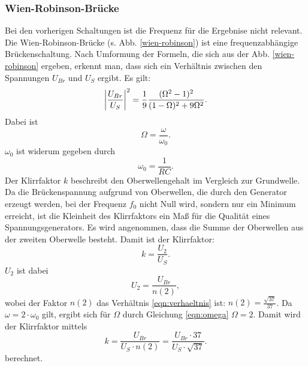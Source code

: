 \subsubsection{Wien-Robinson-Brücke}
Bei den vorherigen Schaltungen ist die Frequenz für die Ergebnise nicht relevant. %
\newline
Die Wien-Robinson-Brücke (s. Abb. \ref{wien-robinson}) ist eine frequenzabhängige Brückenschaltung.
Nach Umformung der Formeln, die sich aus der Abb. \ref{wien-robinson} ergeben, erkennt man, dass
sich ein Verhältnis zwischen den Spannungen $U_{Br}$ und $U_S$ ergibt. 
Es gilt:
\begin{equation}
\abs{\frac{U_{Br}}{U_S}}^2 = \frac{1}{9} \frac{(\Omega^2 -1)^2}{(1- \Omega)^2 + 9 \Omega^2}.
    \label{eqn:verhaeltnis}
\end{equation}
Dabei ist
\begin{equation}
    \Omega = \frac{\omega}{\omega_0}.
    \label{eqn:omega}
\end{equation}
$\omega_0$ ist widerum gegeben durch
\begin{equation}
    \omega_0 = \frac{1}{RC}.
    \label{omega0}
\end{equation}
\newline
Der Klirrfaktor $k$ beschreibt den Oberwellengehalt im Vergleich zur
Grundwelle. Da die Brückenspannung aufgrund von Oberwellen, die durch
den Generator erzeugt werden, bei der Frequenz $f_0$ nicht Null wird,
sondern nur ein Minimum erreicht, ist die Kleinheit des Klirrfaktors
ein Maß für die Qualität eines Spannungsgenerators.
\newline
Es wird angenommen, dass die Summe der Oberwellen aus der zweiten
Oberwelle besteht. Damit ist der Klirrfaktor:
\begin{equation*}
    k = \frac{U_2}{U_S}.
\end{equation*}
$U_2$ ist dabei
\begin{equation*}
    U_2 = \frac{U_{Br}}{n(2)},
\end{equation*}
wobei der Faktor $n(2)$ das Verhältnis \eqref{eqn:verhaeltnis} ist: $n(2) = \frac{\sqrt{37}}{37}$. %
Da $\omega = 2 \cdot \omega_0$ gilt, ergibt sich für $\Omega$ durch Gleichung \eqref{eqn:omega}
$\Omega = 2$.
Damit wird der Klirrfaktor mittels
\begin{equation}
    k = \frac{U_{Br}}{U_S \cdot n(2)} = \frac{U_{Br} \cdot 37}{U_S \cdot \sqrt{37}}. %
    \label{eqn:k}
\end{equation}
berechnet.

